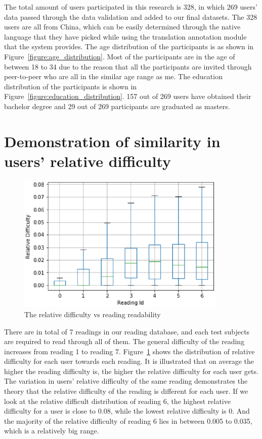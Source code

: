 The total amount of users participated in this research is 328, in which 269 users' data passed through the data validation and added to our final datasets. The 328 users are all from China, which can be easily determined through the native language that they have picked while using the translation annotation module that the system provides. The age distribution of the participants is as shown in Figure~\ref{figure:age_distribution}. Most of the participants are in the age of between 18 to 34 due to the reason that all the participants are invited through peer-to-peer who are all in the similar age range as me. The education distribution of the participants is shown in Figure~\ref{figure:education_distribution}. 157 out of 269 users have obtained their bachelor degree and 29 out of 269 participants are graduated as masters. 

\section{Demonstration of similarity in users' relative difficulty}

\begin{figure}[tbp]
 \begin{center}
  \includegraphics[width=100mm]{data_all_RD_rid.eps}
 \end{center}
 \caption{\label{figure:all_RD_rid} The relative difficulty vs reading readability}
\end{figure}

There are in total of 7 readings in our reading database, and each test subjects are required to read through all of them. The general difficulty of the reading increases from reading 1 to reading 7. Figure~\ref{figure:all_RD_rid} shows the distribution of relative difficulty for each user towards each reading. It is illustrated that on average the higher the reading difficulty is, the higher the relative difficulty for each user gets. The variation in users' relative difficulty of the same reading demonstrates the theory that the relative difficulty of the reading is different for each user. If we look at the relative difficult distribution of reading 6, the highest relative difficulty for a user is close to 0.08, while the lowest relative difficulty is 0. And the majority of the relative difficulty of reading 6 lies in between 0.005 to 0.035, which is a relatively big range. 

